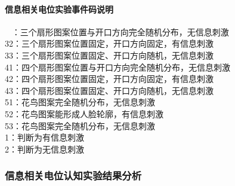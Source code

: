 \documentclass{hitreport}
\begin{document}
\paragraph{信息相关电位实验事件码说明}~{}
：三个扇形图案位置与开口方向完全随机分布，无信息刺激\\
32：三个扇形图案位置固定，开口方向固定，有信息刺激\\
33：三个扇形图案位置固定、开口方向随机，无信息刺激\\
41：四个扇形图案位置与开口方向完全随机分布，无信息刺激\\
42：四个扇形图案位置固定，开口方向固定，有信息刺激\\
43：四个扇形图案位置固定、开口方向随机，无信息刺激\\
51：花鸟图案完全随机分布，无信息刺激\\
52：花鸟图案能形成人脸轮廓，有信息刺激\\
53：花鸟图案完全随机分布，无信息刺激\\
1：判断为有信息刺激\\
2：判断为无信息刺激

\subsubsection{信息相关电位认知实验结果分析}


\newpage

\renewcommand\refname{参考文献}
 
 

\newpage
\begin{appendices}

%
%
%
%
%
%
%
%
%
%
%

\end{appendices}
\end{document}
